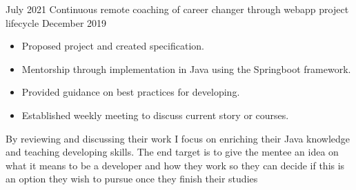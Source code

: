 %
%
%

  \begin{experiences}
    \mentoring
      {July 2021}
      {Continuous remote coaching of career changer through webapp project lifecycle}
      {December 2019}
      {
        \begin{itemize}
          \item Proposed project and created specification.
          \item Mentorship through implementation in Java using the Springboot framework.
          \item Provided guidance on best practices for developing.
          \item Established weekly meeting to discuss current story or courses.
        \end{itemize}
        {By reviewing and discussing their work I focus on enriching their Java knowledge and teaching developing skills.
        The end target is to give the mentee an idea on what it means to be a developer and how they work
        so they can decide if this is an option they wish to pursue once they finish their studies}
      }
  \end{experiences}